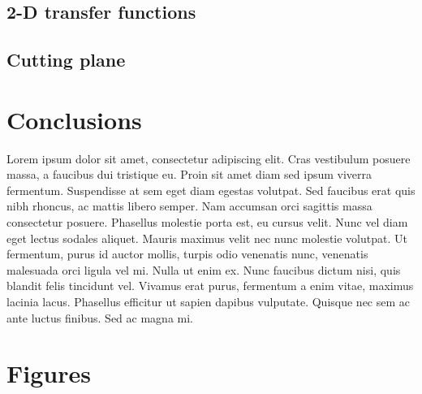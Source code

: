 \documentclass[a4paper]{article}
\begin{document}
\subsection{2-D transfer functions}

\subsection{Cutting plane}

\section{Conclusions}

Lorem ipsum dolor sit amet, consectetur adipiscing elit. Cras vestibulum posuere massa, a faucibus dui tristique eu. Proin sit amet diam sed ipsum viverra fermentum. Suspendisse at sem eget diam egestas volutpat. Sed faucibus erat quis nibh rhoncus, ac mattis libero semper. Nam accumsan orci sagittis massa consectetur posuere. Phasellus molestie porta est, eu cursus velit. Nunc vel diam eget lectus sodales aliquet. Mauris maximus velit nec nunc molestie volutpat. Ut fermentum, purus id auctor mollis, turpis odio venenatis nunc, venenatis malesuada orci ligula vel mi. Nulla ut enim ex. Nunc faucibus dictum nisi, quis blandit felis tincidunt vel. Vivamus erat purus, fermentum a enim vitae, maximus lacinia lacus. Phasellus efficitur ut sapien dapibus vulputate. Quisque nec sem ac ante luctus finibus. Sed ac magna mi.




\pagebreak
\appendix
\section{Figures}
\end{document}
